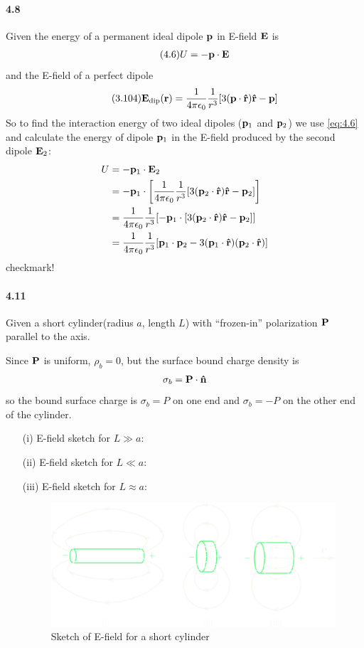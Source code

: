 \documentclass[../main.tex]{subfiles}
\begin{document}
\newpage
\paragraph{4.8}
Given the energy of a permanent ideal dipole $\vb p$ in E-field $\vb E$ is
\begin{align*} \tag{4.6} \label{eq:4.6}
    U = -\vb p \cdot \vb E
\end{align*}
and the E-field of a perfect dipole
\begin{align*} \tag{3.104} \label{eq:3.104}
    \vb E_\text{dip} (\vb r) = \frac{1}{4\pi\epsilon_0} \frac{1}{r^3} [3(\vb p \cdot \vu r) \vu r - \vb p]
\end{align*}
So to find the interaction energy of two ideal dipoles ($\vb p_1$ and $\vb p_2$) we use \eqref{eq:4.6} and calculate the energy of dipole $\vb p_1$ in the E-field produced by the second dipole $\vb E_2$:
\begin{align*}
    U &= -\vb p_1 \cdot \vb E_2 \\
    &= -\vb p_1 \cdot \qt[\ke \frac{1}{r^3} [3(\vb p_2 \cdot \vu r) \vu r - \vb p_2]] \\
    &= \ke \frac{1}{r^3} [-\vb p_1 \cdot [3(\vb p_2 \cdot \vu r) \vu r - \vb p_2]] \\
    &= \ke \frac{1}{r^3} \qt[\vb p_1 \cdot \vb p_2 - 3 (\vb p_1 \cdot \vu r)(\vb p_2 \cdot \vu r)]
\end{align*}
checkmark!

\newpage
\paragraph{4.11} Given a short cylinder(radius $a$, length $L$) with ``frozen-in'' polarization $\vb P$ parallel to the axis.

Since $\vb P$ is uniform, $\rho_b = 0$, but the surface bound charge density is
    \begin{align*}
        \sigma_b = \vb P \cdot \vu n
    \end{align*}
    so the bound surface charge is $\sigma_b = P$ on one end and $\sigma_b = -P$ on the other end of the cylinder. 
\begin{itemize}
    \item [(i)] E-field sketch for $L \gg a$:
    \item [(ii)] E-field sketch for $L \ll a$:
    \item [(iii)] E-field sketch for $L \approx a$:
    \begin{figure}[ht]
        \centering
        \includegraphics[width=0.8\linewidth]{hw4_11.png}
        \captionsetup{width=0.8\linewidth}
        \caption{Sketch of E-field for a short cylinder}
    \end{figure}
\end{itemize}
\end{document}
